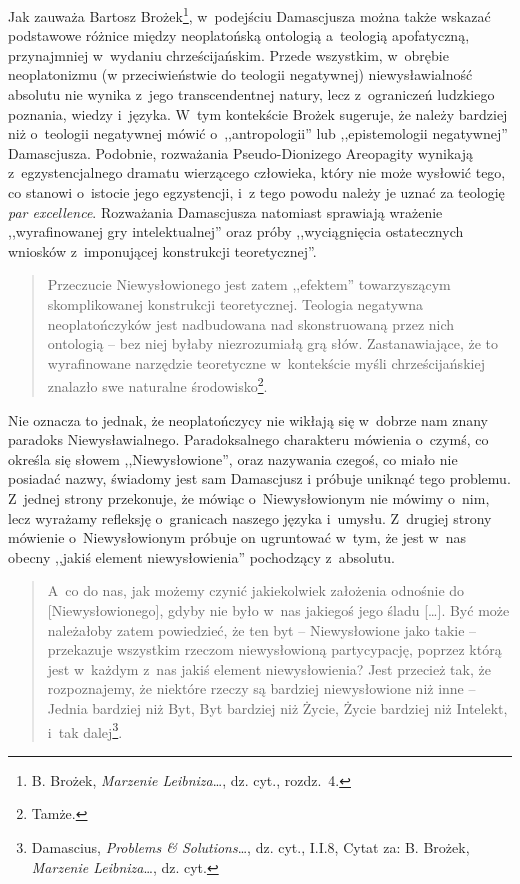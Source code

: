 Jak zauważa Bartosz Brożek\footnote{B. Brożek, \textit{Marzenie Leibniza}\ldots, dz. cyt., rozdz.~4.}, w~podejściu Damascjusza można także wskazać podstawowe różnice między neoplatońską ontologią a~teologią apofatyczną, przynajmniej w~wydaniu chrześcijańskim. Przede wszystkim, w~obrębie neoplatonizmu (w przeciwieństwie do teologii negatywnej) niewysławialność absolutu nie wynika z~jego transcendentnej natury, lecz z~ograniczeń ludzkiego poznania, wiedzy i~języka. W~tym kontekście Brożek sugeruje, że należy bardziej niż o~teologii negatywnej mówić o~,,antropologii'' lub ,,epistemologii negatywnej'' Damascjusza. Podobnie, rozważania Pseudo-Dionizego Areopagity wynikają z~egzystencjalnego dramatu wierzącego człowieka, który nie może wysłowić tego, co stanowi o~istocie jego egzystencji, i~z tego powodu należy je uznać za teologię \textit{par excellence}. Rozważania Damascjusza natomiast sprawiają wrażenie ,,wyrafinowanej gry intelektualnej'' oraz próby ,,wyciągnięcia ostatecznych wniosków z~imponującej konstrukcji teoretycznej''.

\begin{quote}
Przeczucie Niewysłowionego jest zatem ,,efektem'' towarzyszącym skomplikowanej konstrukcji teoretycznej. Teologia negatywna neoplatończyków jest nadbudowana nad skonstruowaną przez nich ontologią -- bez niej byłaby niezrozumiałą grą słów. Zastanawiające, że to wyrafinowane narzędzie teoretyczne w~kontekście myśli chrześcijańskiej znalazło swe naturalne środowisko\footnote{Tamże.}.
\end{quote}

Nie oznacza to jednak, że neoplatończycy nie wikłają się w~dobrze nam znany paradoks Niewysławialnego. Paradoksalnego charakteru mówienia o~czymś, co określa się słowem ,,Niewysłowione'', oraz nazywania czegoś, co miało nie posiadać nazwy, świadomy jest sam Damascjusz i próbuje uniknąć tego problemu. Z~jednej strony przekonuje, że mówiąc o~Niewysłowionym nie mówimy o~nim, lecz wyrażamy refleksję o~granicach naszego języka i~umysłu. Z~drugiej strony mówienie o~Niewysłowionym próbuje on ugruntować w~tym, że jest w~nas obecny ,,jakiś element niewysłowienia'' pochodzący z~absolutu.

\begin{quote}
A~co do nas, jak możemy czynić jakiekolwiek założenia odnośnie do [Niewysłowionego], gdyby nie było w~nas jakiegoś jego śladu [\ldots]. Być może należałoby zatem powiedzieć, że ten byt -- Niewysłowione jako takie -- przekazuje wszystkim rzeczom niewysłowioną partycypację, poprzez którą jest w~każdym z~nas jakiś element niewysłowienia? Jest przecież tak, że rozpoznajemy, że niektóre rzeczy są bardziej niewysłowione niż inne -- Jednia bardziej niż Byt, Byt bardziej niż Życie, Życie bardziej niż Intelekt, i~tak dalej\footnote{Damascius, \textit{Problems \& Solutions}\ldots, dz. cyt., I.I.8, Cytat za: B. Brożek, \textit{Marzenie Leibniza}\ldots, dz. cyt.}.
\end{quote}

